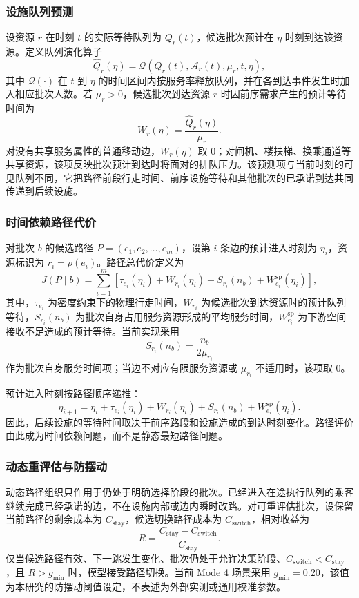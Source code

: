 \documentclass[UTF8,a4paper,12pt]{ctexart}
\begin{document}
\subsubsection{设施队列预测}

设资源 \(r\) 在时刻 \(t\) 的实际等待队列为 \(Q_r(t)\)，候选批次预计在 \(\eta\) 时刻到达该资源。定义队列演化算子
\[
\widehat Q_r(\eta)=
\mathcal{Q}\left(Q_r(t),\mathcal{A}_r(t),\mu_r,t,\eta\right),
\]
其中 \(\mathcal{Q}(\cdot)\) 在 \(t\) 到 \(\eta\) 的时间区间内按服务率释放队列，并在各到达事件发生时加入相应批次人数。若 \(\mu_r>0\)，候选批次到达资源 \(r\) 时因前序需求产生的预计等待时间为
\[
W_r(\eta)=\frac{\widehat Q_r(\eta)}{\mu_r}.
\]
对没有共享服务属性的普通移动边，\(W_r(\eta)\) 取 0；对闸机、楼扶梯、换乘通道等共享资源，该项反映批次预计到达时将面对的排队压力。该预测项与当前时刻的可见队列不同，它把路径前段行走时间、前序设施等待和其他批次的已承诺到达共同传递到后续设施。

\subsubsection{时间依赖路径代价}

对批次 \(b\) 的候选路径 \(P=(e_1,e_2,\ldots,e_m)\)，设第 \(i\) 条边的预计进入时刻为 \(\eta_i\)，资源标识为 \(r_i=\rho(e_i)\)。路径总代价定义为
\[
J(P\mid b)=\sum_{i=1}^{m}
\left[\tau_{e_i}(\eta_i)+W_{r_i}(\eta_i)+S_{r_i}(n_b)+W^{\mathrm{sp}}_{e_i}(\eta_i)\right],
\]
其中，\(\tau_{e_i}\) 为密度约束下的物理行走时间，\(W_{r_i}\) 为候选批次到达资源时的预计队列等待，\(S_{r_i}(n_b)\) 为批次自身占用服务资源形成的平均服务时间，\(W^{\mathrm{sp}}_{e_i}\) 为下游空间接收不足造成的预计等待。当前实现采用
\[
S_{r_i}(n_b)=\frac{n_b}{2\mu_{r_i}}
\]
作为批次自身服务时间项；当边不对应有限服务资源或 \(\mu_{r_i}\) 不适用时，该项取 0。

预计进入时刻按路径顺序递推：
\[
\eta_{i+1}=\eta_i+\tau_{e_i}(\eta_i)+W_{r_i}(\eta_i)+S_{r_i}(n_b)+W^{\mathrm{sp}}_{e_i}(\eta_i).
\]
因此，后续设施的等待时间取决于前序路段和设施造成的到达时刻变化。路径评价由此成为时间依赖问题，而不是静态最短路径问题。

\subsubsection{动态重评估与防摆动}

动态路径组织只作用于仍处于明确选择阶段的批次。已经进入在途执行队列的乘客继续完成已经承诺的边，不在设施内部或边内瞬时改路。对可重评估批次，设保留当前路径的剩余成本为 \(C_{\mathrm{stay}}\)，候选切换路径成本为 \(C_{\mathrm{switch}}\)，相对收益为
\[
R=\frac{C_{\mathrm{stay}}-C_{\mathrm{switch}}}{C_{\mathrm{stay}}}.
\]
仅当候选路径有效、下一跳发生变化、批次仍处于允许决策阶段、\(C_{\mathrm{switch}}<C_{\mathrm{stay}}\)，且 \(R>g_{\min}\) 时，模型接受路径切换。当前 Mode 4 场景采用 \(g_{\min}=0.20\)，该值为本研究的防摆动阈值设定，不表述为外部实测或通用校准参数。
\end{document}

